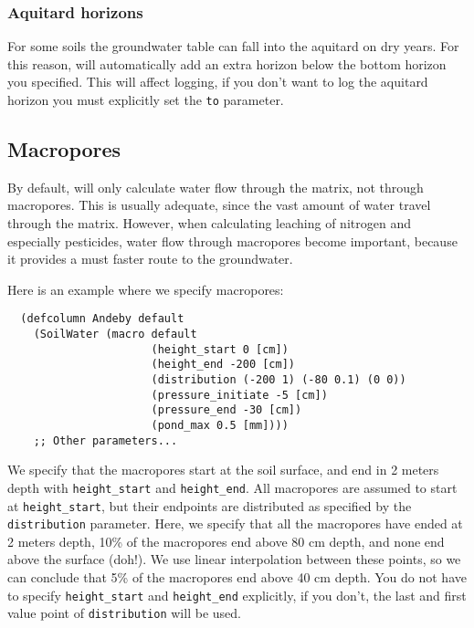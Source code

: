 \documentclass[a4paper,11pt]{article}
\begin{document}
\subsubsection{Aquitard horizons}
\label{sec:aquitard}

For some soils the groundwater table can fall into the aquitard on dry
years.  For this reason, \daisy{} will automatically add an extra
horizon below the bottom horizon you specified.  This will affect
logging, if you don't want to log the aquitard horizon you must
explicitly set the \texttt{to} parameter.

\subsection{Macropores}
\label{sec:macro}

By default, \daisy{} will only calculate water flow through the
matrix, not through macropores.  This is usually adequate, since the
vast amount of water travel through the matrix.  However, when
calculating leaching of nitrogen and especially pesticides, water flow
through macropores become important, because it provides a must faster
route to the groundwater.

Here is an example where we specify macropores:
\begin{verbatim}
  (defcolumn Andeby default
    (SoilWater (macro default
                      (height_start 0 [cm])
                      (height_end -200 [cm])
                      (distribution (-200 1) (-80 0.1) (0 0))
                      (pressure_initiate -5 [cm])
                      (pressure_end -30 [cm])
                      (pond_max 0.5 [mm])))
    ;; Other parameters...
\end{verbatim}

We specify that the macropores start at the soil surface, and end in 2
meters depth with \texttt{height\_start} and \texttt{height\_end}.  All
macropores are assumed to start at \texttt{height\_start}, but their
endpoints are distributed as specified by the \texttt{distribution}
parameter.  Here, we specify that all the macropores have ended at 2
meters depth, 10\% of the macropores end above 80 cm depth, and none
end above the surface (doh!).  We use linear interpolation between
these points, so we can conclude that 5\% of the macropores end above
40 cm depth.  You do not have to specify \texttt{height\_start} and
\texttt{height\_end} explicitly, if you don't, the last and first
value point of \texttt{distribution} will be used.
\end{document}
